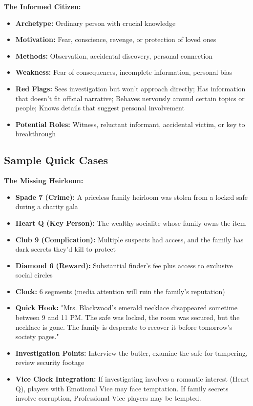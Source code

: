 \documentclass[11pt]{article}
\begin{document}
\textbf{The Informed Citizen:}
\begin{itemize}
    \item \textbf{Archetype:} Ordinary person with crucial knowledge
    \item \textbf{Motivation:} Fear, conscience, revenge, or protection of loved ones
    \item \textbf{Methods:} Observation, accidental discovery, personal connection
    \item \textbf{Weakness:} Fear of consequences, incomplete information, personal bias
    \item \textbf{Red Flags:} Sees investigation but won't approach directly; Has information that doesn't fit official narrative; Behaves nervously around certain topics or people; Knows details that suggest personal involvement
    \item \textbf{Potential Roles:} Witness, reluctant informant, accidental victim, or key to breakthrough
\end{itemize}

\subsection{Sample Quick Cases}

\textbf{The Missing Heirloom:}
\begin{itemize}
    \item \textbf{Spade 7 (Crime):} A priceless family heirloom was stolen from a locked safe during a charity gala
    \item \textbf{Heart Q (Key Person):} The wealthy socialite whose family owns the item
    \item \textbf{Club 9 (Complication):} Multiple suspects had access, and the family has dark secrets they'd kill to protect
    \item \textbf{Diamond 6 (Reward):} Substantial finder's fee plus access to exclusive social circles
    \item \textbf{Clock:} 6 segments (media attention will ruin the family's reputation)
    \item \textbf{Quick Hook:} "Mrs. Blackwood's emerald necklace disappeared sometime between 9 and 11 PM. The safe was locked, the room was secured, but the necklace is gone. The family is desperate to recover it before tomorrow's society pages."
    \item \textbf{Investigation Points:} Interview the butler, examine the safe for tampering, review security footage
    \item \textbf{Vice Clock Integration:} If investigating involves a romantic interest (Heart Q), players with Emotional Vice may face temptation. If family secrets involve corruption, Professional Vice players may be tempted.
\end{itemize}
\end{document}
